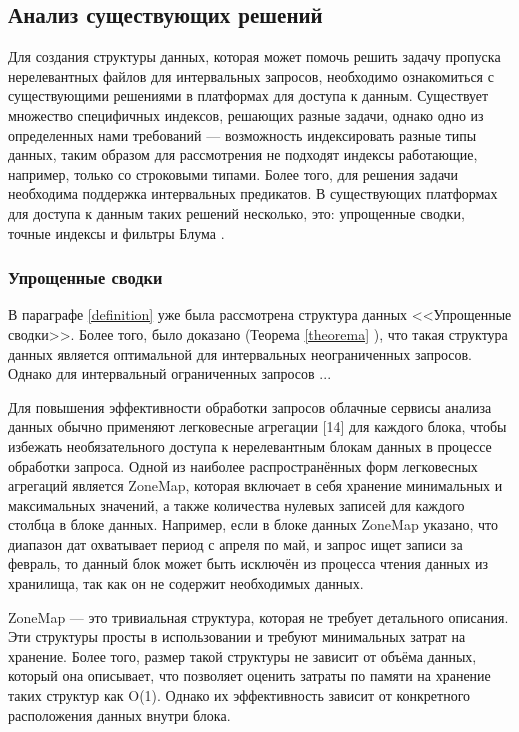 \subsection{Анализ существующих решений} \label{indexes}

Для создания структуры данных, которая может помочь решить задачу пропуска нерелевантных файлов для интервальных запросов, необходимо ознакомиться с существующими решениями в платформах для доступа к данным. Существует множество специфичных индексов, решающих разные задачи, однако одно из определенных нами требований --- возможность индексировать разные типы данных, таким образом для рассмотрения не подходят индексы работающие, например, только со строковыми типами. Более того, для решения задачи необходима поддержка интервальных предикатов. В существующих платформах для доступа к данным таких решений несколько, это: упрощенные сводки, точные индексы и фильтры Блума \cite{Extensible_data_skipping}.

\subsubsection{Упрощенные сводки} 

В параграфе \ref{definition} уже была рассмотрена структура данных {<<Упрощенные сводки>>}. Более того, было доказано (Теорема \ref{theorema} ), что такая структура данных является оптимальной для интервальных неограниченных запросов. Однако для интервальный ограниченных запросов ...

Для повышения эффективности обработки запросов облачные сервисы анализа данных обычно применяют легковесные агрегации [14] для каждого блока, чтобы избежать необязательного доступа к нерелевантным блокам данных в процессе обработки запроса. Одной из наиболее распространённых форм легковесных агрегаций является ZoneMap, которая включает в себя хранение минимальных и максимальных значений, а также количества нулевых записей для каждого столбца в блоке данных. Например, если в блоке данных ZoneMap указано, что диапазон дат охватывает период с апреля по май, и запрос ищет записи за февраль, то данный блок может быть исключён из процесса чтения данных из хранилища, так как он не содержит необходимых данных.

ZoneMap — это тривиальная структура, которая не требует детального описания. Эти структуры просты в использовании и требуют минимальных затрат на хранение. Более того, размер такой структуры не зависит от объёма данных, который она описывает, что позволяет оценить затраты по памяти на хранение таких структур как O(1). Однако их эффективность зависит от конкретного расположения данных внутри блока.

